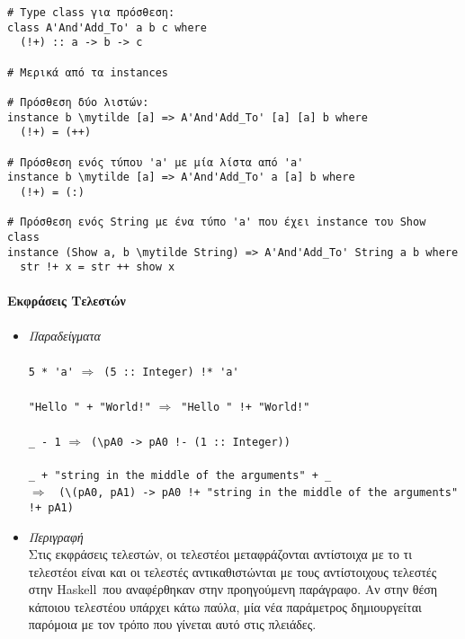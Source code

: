 \documentclass[diploma]{softlab-thesis}
\def\H{Haskell}
\def\lra{$\Longrightarrow$\ }
\newcommand{\mytilde}{$\sim$}
\begin{document}
\begin{Verbatim}[commandchars=\\\{\}]
# Type class για πρόσθεση:
class A'And'Add_To' a b c where
  (!+) :: a -> b -> c

# Μερικά από τα instances

# Πρόσθεση δύο λιστών:
instance b \mytilde [a] => A'And'Add_To' [a] [a] b where
  (!+) = (++)

# Πρόσθεση ενός τύπου 'a' με μία λίστα από 'a'
instance b \mytilde [a] => A'And'Add_To' a [a] b where
  (!+) = (:)

# Πρόσθεση ενός String με ένα τύπο 'a' που έχει instance του Show class
instance (Show a, b \mytilde String) => A'And'Add_To' String a b where
  str !+ x = str ++ show x

\end{Verbatim}

\paragraph{Εκφράσεις Τελεστών}

\begin{itemize}
\item
\textit{Παραδείγματα}\\\\
\verb|5 * 'a'| \lra \verb|(5 :: Integer) !* 'a'|
\\\\
\verb|"Hello " + "World!"| \lra \verb|"Hello " !+ "World!"|
\\\\
\verb|_ - 1| \lra \verb|(\pA0 -> pA0 !- (1 :: Integer))|
\\\\
\verb|_ + "string in the middle of the arguments" + _|
\\\lra
\verb|(\(pA0, pA1) -> pA0 !+ "string in the middle of the arguments" !+ pA1)|
\\

\item
\textit{Περιγραφή}\\

Στις εκφράσεις τελεστών, οι τελεστέοι μεταφράζονται αντίστοιχα με το τι
τελεστέοι είναι και οι τελεστές αντικαθιστώνται με τους αντίστοιχους τελεστές
στην \H\ που αναφέρθηκαν στην προηγούμενη παράγραφο. Αν στην θέση κάποιου
τελεστέου υπάρχει κάτω παύλα, μία νέα παράμετρος δημιουργείται παρόμοια με τον
τρόπο που γίνεται αυτό στις πλειάδες.

\end{itemize}
\end{document}
